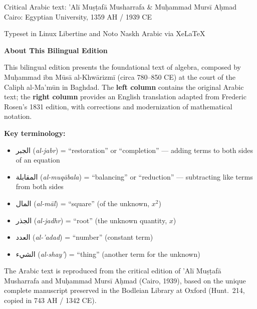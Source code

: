 \documentclass[11pt,a4paper]{book}
\newcommand{\ar}[1]{{\arabicfont\beginR #1\endR}}
\begin{document}
\begin{titlepage}
\begin{center}
\vspace{0.8cm}

{\small Critical Arabic text: 'Al\={i} Mu\d{s}\d{t}af\=a Musharrafa \& Mu\d{h}ammad Murs\={i} A\d{h}mad}\\[0.1cm]
{\small Cairo: Egyptian University, 1359 AH / 1939 CE}

\vfill

{\footnotesize Typeset in Linux Libertine and Noto Naskh Arabic via XeLaTeX}

\end{center}
\end{titlepage}

\thispagestyle{empty}
\begin{center}
\vspace*{2cm}

{\Large\textbf{About This Bilingual Edition}}

\vspace{0.8cm}

\begin{minipage}{0.85\textwidth}
\small
This bilingual edition presents the foundational text of algebra, composed by
Mu\d{h}ammad ibn M\=us\=a al-Khw\=arizm\={i} (circa 780--850 CE) at the court
of the Caliph al-Ma'm\=un in Baghdad. The \textbf{left column} contains the
original Arabic text; the \textbf{right column} provides an English translation
adapted from Frederic Rosen's 1831 edition, with corrections and modernization
of mathematical notation.

\vspace{0.4cm}

\textbf{Key terminology:}
\begin{itemize}[leftmargin=1.5em,topsep=2pt]
  \item \ar{الجبر} (\textit{al-jabr}) = ``restoration'' or ``completion'' — adding terms to both sides of an equation
  \item \ar{المقابلة} (\textit{al-muq\=abala}) = ``balancing'' or ``reduction'' — subtracting like terms from both sides
  \item \ar{المال} (\textit{al-m\=al}) = ``square'' (of the unknown, $x^2$)
  \item \ar{الجذر} (\textit{al-jadhr}) = ``root'' (the unknown quantity, $x$)
  \item \ar{العدد} (\textit{al-'adad}) = ``number'' (constant term)
  \item \ar{الشيء} (\textit{al-shay'}) = ``thing'' (another term for the unknown)
\end{itemize}

\vspace{0.4cm}

The Arabic text is reproduced from the critical edition of 'Al\={i} Mu\d{s}\d{t}af\=a
Musharrafa and Mu\d{h}ammad Murs\={i} A\d{h}mad (Cairo, 1939), based on the
unique complete manuscript preserved in the Bodleian Library at Oxford
(Hunt.~214, copied in 743 AH / 1342 CE).
\end{minipage}
\end{center}
\end{document}

